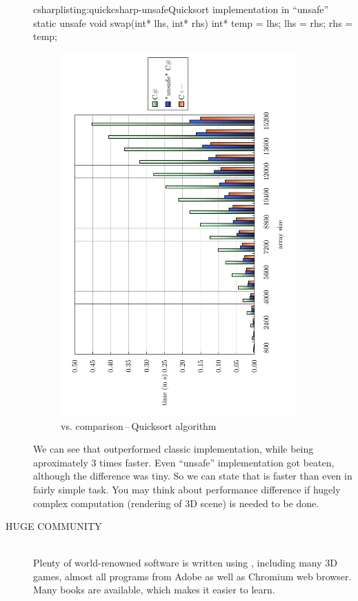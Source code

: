 \begin{description}
\begin{fdoccode}{csharp}{listing:quickcsharp-unsafe}{Quicksort implementation in \enquote{unsafe} \csharp}
static unsafe void swap(int* lhs, int* rhs) {
	int* temp = lhs;
	lhs = rhs;
	rhs = temp;
}
\end{fdoccode}

\begin{figure}[ht]
\centering\includegraphics[width=9cm,angle=-90]{graphics/laboratory/00-langcomparison.pdf}
\caption{\cpp{} vs. \csharp{} comparison\,--\,Quicksort algorithm}\label{figure:comparison}
\end{figure}

We can see that \cpp{} outperformed classic \csharp{} implementation, while being aproximately 3 times faster. Even \enquote{unsafe} \csharp{} implementation got beaten, although the difference was tiny. So we can state that \cpp{} is faster than \csharp{} even in fairly simple task. You may think about performance difference if hugely complex computation (\eg rendering of 3D scene) is needed to be done.

\item[HUGE COMMUNITY\ts{\textcolor{YellowOrange}{great}}]\hfill \\
Plenty of world-renowned software is written using \cpp{}, including many 3D games, almost all programs from Adobe as well as Chromium web browser. Many \cpp{} books are available, which makes it easier to learn.


\end{description}
